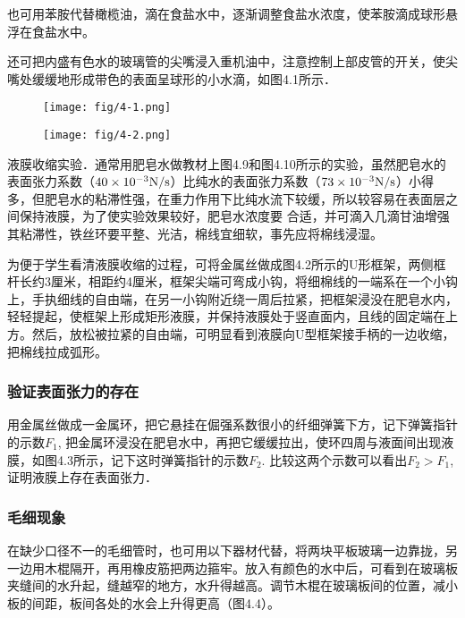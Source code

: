也可用苯胺代替橄榄油，滴在食盐水中，逐渐调整食盐水浓度，使苯胺滴成球形悬浮在食盐水中。

还可把内盛有色水的玻璃管的尖嘴浸入重机油中，注意控制上部皮管的开关，使尖嘴处缓缓地形成带色的表面呈球形的小水滴，如图4.1所示．
\begin{figure}[htp]\centering
    \begin{minipage}[t]{0.48\textwidth}
    \centering
\texttt{[image: fig/4-1.png]}
    \caption{}
    \end{minipage}
    \begin{minipage}[t]{0.48\textwidth}
    \centering
\texttt{[image: fig/4-2.png]}
    \caption{}
    \end{minipage}
    \end{figure}

液膜收缩实验．通常用肥皂水做教材上图4.9和图4.10所示的实验，虽然肥皂水的表面张力系数（$40\times10^{-3}{\rm N/s}$）比纯水的表面张力系数（$73\times10^{-3}{\rm N/s}$）小得多，但肥皂水的粘滞性强，在重力作用下比纯水流下较缓，所以较容易在表面层之间保持液膜，为了使实验效果较好，肥皂水浓度要
合适，并可滴入几滴甘油增强其粘滞性，铁丝环要平整、光洁，棉线宜细软，事先应将棉线浸湿。

为便于学生看清液膜收缩的过程，可将金属丝做成图4.2所示的U形框架，两侧框杆长约3厘米，相距约4厘米，框架尖端可弯成小钩，将细棉线的一端系在一个小钩上，手执细线的自由端，在另一小钩附近绕一周后拉紧，把框架浸没在肥皂水内，轻轻提起，使框架上形成矩形液膜，并保持液膜处于竖直面内，且线的固定端在上方。然后，放松被拉紧的自由端，可明显看到液膜向U型框架接手柄的一边收缩，把棉线拉成弧形。



\subsubsection{验证表面张力的存在}

用金属丝做成一金属环，把它悬挂在倔强系数很小的纤细弹簧下方，记下弹簧指针的示数$F_1$, 把金属环浸没在肥皂水中，再把它缓缓拉出，使环四周与液面间出现液膜，如图4.3所示，记下这时弹簧指针的示数$F_2$. 比较这两个示数可以看出$F_2>F_1$, 证明液膜上存在表面张力．

\subsubsection{毛细现象}

在缺少口径不一的毛细管时，也可用以下器材代替，将两块平板玻璃一边靠拢，另一边用木棍隔开，再用橡皮筋把两边箍牢。放入有颜色的水中后，可看到在玻璃板夹缝间的水升起，缝越窄的地方，水升得越高。调节木棍在玻璃板间的位置，减小板的间距，板间各处的水会上升得更高（图4.4）。

